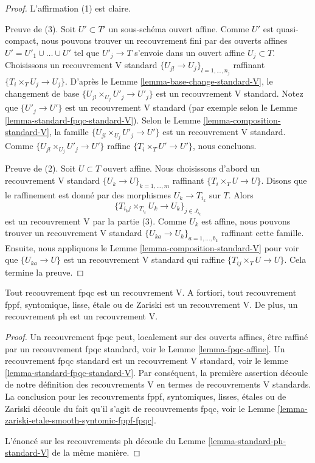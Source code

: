 \begin{proof}
L'affirmation (1) est claire.

\medskip\noindent
Preuve de (3). Soit $U' \subset T'$ un sous-schéma ouvert affine. Comme $U'$ est quasi-compact, nous pouvons trouver un recouvrement fini par des ouverts affines $U' = U'_1 \cup \ldots \cup U'$ tel que $U'_j \to T$ s'envoie dans un ouvert affine $U_j \subset T$. Choisissons un recouvrement V standard $\{U_{jl} \to U_j\}_{l = 1, \ldots, n_j}$ raffinant $\{T_i \times_T U_j \to U_j\}$. D'après le Lemme \ref{lemma-base-change-standard-V}, le changement de base $\{U_{jl} \times_{U_j} U'_j \to U'_j\}$ est un recouvrement V standard. Notez que $\{U'_j \to U'\}$ est un recouvrement V standard (par exemple selon le Lemme \ref{lemma-standard-fpqc-standard-V}). Selon le Lemme \ref{lemma-composition-standard-V}, la famille $\{U_{jl} \times_{U_j} U'_j \to U'\}$ est un recouvrement V standard. Comme $\{U_{jl} \times_{U_j} U'_j \to U'\}$ raffine $\{T_i \times_T U' \to U'\}$, nous concluons.

\medskip\noindent
Preuve de (2). Soit $U \subset T$ ouvert affine. Nous choisissons d'abord un recouvrement V standard $\{U_k \to U\}_{k = 1, \ldots, m}$ raffinant $\{T_i \times_T U \to U\}$. Disons que le raffinement est donné par des morphismes $U_k \to T_{i_k}$ sur $T$. Alors
$$
\{T_{i_kj} \times_{T_{i_k}} U_k \to U_k\}_{j \in J_{i_k}}
$$
est un recouvrement V par la partie (3). Comme $U_k$ est affine, nous pouvons trouver un recouvrement V standard $\{U_{ka} \to U_k\}_{a = 1, \ldots, b_k}$ raffinant cette famille. Ensuite, nous appliquons le Lemme \ref{lemma-composition-standard-V} pour voir que $\{U_{ka} \to U\}$ est un recouvrement V standard qui raffine $\{T_{ij} \times_T U \to U\}$. Cela termine la preuve.
\end{proof}

\begin{lemma}
\label{lemma-zariski-etale-smooth-syntomic-fppf-fpqc-ph-V}
Tout recouvrement fpqc est un recouvrement V. A fortiori, tout recouvrement fppf, syntomique, lisse, étale ou de Zariski est un recouvrement V. De plus, un recouvrement ph est un recouvrement V.
\end{lemma}

\begin{proof}
Un recouvrement fpqc peut, localement sur des ouverts affines, être raffiné par un recouvrement fpqc standard, voir le Lemme \ref{lemma-fpqc-affine}. Un recouvrement fpqc standard est un recouvrement V standard, voir le lemme \ref{lemma-standard-fpqc-standard-V}. Par conséquent, la première assertion découle de notre définition des recouvrements V en termes de recouvrements V standards. La conclusion pour les recouvrements fppf, syntomiques, lisses, étales ou de Zariski découle du fait qu'il s'agit de recouvrements fpqc, voir le Lemme \ref{lemma-zariski-etale-smooth-syntomic-fppf-fpqc}.

\medskip\noindent
L'énoncé sur les recouvrements ph découle du Lemme \ref{lemma-standard-ph-standard-V} de la même manière.
\end{proof}

